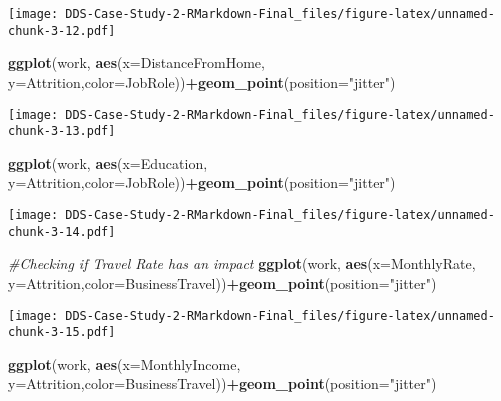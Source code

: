 \documentclass[]{article}
\newenvironment{Shaded}{\begin{snugshade}}{\end{snugshade}}
\newcommand{\CommentTok}[1]{\textcolor[rgb]{0.56,0.35,0.01}{\textit{#1}}}
\newcommand{\DataTypeTok}[1]{\textcolor[rgb]{0.13,0.29,0.53}{#1}}
\newcommand{\KeywordTok}[1]{\textcolor[rgb]{0.13,0.29,0.53}{\textbf{#1}}}
\newcommand{\NormalTok}[1]{#1}
\newcommand{\OperatorTok}[1]{\textcolor[rgb]{0.81,0.36,0.00}{\textbf{#1}}}
\newcommand{\StringTok}[1]{\textcolor[rgb]{0.31,0.60,0.02}{#1}}
\begin{document}
\texttt{[image: DDS-Case-Study-2-RMarkdown-Final\_files/figure-latex/unnamed-chunk-3-12.pdf]}

\begin{Shaded}
\begin{Highlighting}[]
\KeywordTok{ggplot}\NormalTok{(work, }\KeywordTok{aes}\NormalTok{(}\DataTypeTok{x=}\NormalTok{DistanceFromHome, }\DataTypeTok{y=}\NormalTok{Attrition,}\DataTypeTok{color=}\NormalTok{JobRole))}\OperatorTok{+}\KeywordTok{geom_point}\NormalTok{(}\DataTypeTok{position=}\StringTok{"jitter"}\NormalTok{)}
\end{Highlighting}
\end{Shaded}

\texttt{[image: DDS-Case-Study-2-RMarkdown-Final\_files/figure-latex/unnamed-chunk-3-13.pdf]}

\begin{Shaded}
\begin{Highlighting}[]
\KeywordTok{ggplot}\NormalTok{(work, }\KeywordTok{aes}\NormalTok{(}\DataTypeTok{x=}\NormalTok{Education, }\DataTypeTok{y=}\NormalTok{Attrition,}\DataTypeTok{color=}\NormalTok{JobRole))}\OperatorTok{+}\KeywordTok{geom_point}\NormalTok{(}\DataTypeTok{position=}\StringTok{"jitter"}\NormalTok{)}
\end{Highlighting}
\end{Shaded}

\texttt{[image: DDS-Case-Study-2-RMarkdown-Final\_files/figure-latex/unnamed-chunk-3-14.pdf]}

\begin{Shaded}
\begin{Highlighting}[]
\CommentTok{#Checking if Travel Rate has an impact}
\KeywordTok{ggplot}\NormalTok{(work, }\KeywordTok{aes}\NormalTok{(}\DataTypeTok{x=}\NormalTok{MonthlyRate, }\DataTypeTok{y=}\NormalTok{Attrition,}\DataTypeTok{color=}\NormalTok{BusinessTravel))}\OperatorTok{+}\KeywordTok{geom_point}\NormalTok{(}\DataTypeTok{position=}\StringTok{"jitter"}\NormalTok{)}
\end{Highlighting}
\end{Shaded}

\texttt{[image: DDS-Case-Study-2-RMarkdown-Final\_files/figure-latex/unnamed-chunk-3-15.pdf]}

\begin{Shaded}
\begin{Highlighting}[]
\KeywordTok{ggplot}\NormalTok{(work, }\KeywordTok{aes}\NormalTok{(}\DataTypeTok{x=}\NormalTok{MonthlyIncome, }\DataTypeTok{y=}\NormalTok{Attrition,}\DataTypeTok{color=}\NormalTok{BusinessTravel))}\OperatorTok{+}\KeywordTok{geom_point}\NormalTok{(}\DataTypeTok{position=}\StringTok{"jitter"}\NormalTok{)}
\end{Highlighting}
\end{Shaded}
\end{document}
